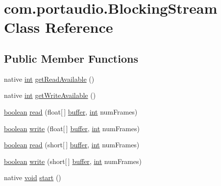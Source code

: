 \hypertarget{classcom_1_1portaudio_1_1_blocking_stream}{}\section{com.\+portaudio.\+Blocking\+Stream Class Reference}
\label{classcom_1_1portaudio_1_1_blocking_stream}
\subsection*{Public Member Functions}
\begin{DoxyCompactItemize}
\item 
native \hyperlink{xmltok_8h_a5a0d4a5641ce434f1d23533f2b2e6653}{int} \hyperlink{classcom_1_1portaudio_1_1_blocking_stream_a4cb237d1596fcfb10adf7e21166bfd10}{get\+Read\+Available} ()
\item 
native \hyperlink{xmltok_8h_a5a0d4a5641ce434f1d23533f2b2e6653}{int} \hyperlink{classcom_1_1portaudio_1_1_blocking_stream_a24fcac3b87ee7f15cbf97c9f821009dd}{get\+Write\+Available} ()
\item 
\hyperlink{cext_8h_a7670a4e8a07d9ebb00411948b0bbf86d}{boolean} \hyperlink{classcom_1_1portaudio_1_1_blocking_stream_ab6004b6eb81636c73053841b32c371fa}{read} (float\mbox{[}$\,$\mbox{]} \hyperlink{structbuffer}{buffer}, \hyperlink{xmltok_8h_a5a0d4a5641ce434f1d23533f2b2e6653}{int} num\+Frames)
\item 
\hyperlink{cext_8h_a7670a4e8a07d9ebb00411948b0bbf86d}{boolean} \hyperlink{classcom_1_1portaudio_1_1_blocking_stream_ab12ce694b065cb1729fff4815345b4a9}{write} (float\mbox{[}$\,$\mbox{]} \hyperlink{structbuffer}{buffer}, \hyperlink{xmltok_8h_a5a0d4a5641ce434f1d23533f2b2e6653}{int} num\+Frames)
\item 
\hyperlink{cext_8h_a7670a4e8a07d9ebb00411948b0bbf86d}{boolean} \hyperlink{classcom_1_1portaudio_1_1_blocking_stream_a3817b1e550497d46eb20459d9a41dc03}{read} (short\mbox{[}$\,$\mbox{]} \hyperlink{structbuffer}{buffer}, \hyperlink{xmltok_8h_a5a0d4a5641ce434f1d23533f2b2e6653}{int} num\+Frames)
\item 
\hyperlink{cext_8h_a7670a4e8a07d9ebb00411948b0bbf86d}{boolean} \hyperlink{classcom_1_1portaudio_1_1_blocking_stream_a4a7b50bb6f5f7cb1cb95748ec20ca874}{write} (short\mbox{[}$\,$\mbox{]} \hyperlink{structbuffer}{buffer}, \hyperlink{xmltok_8h_a5a0d4a5641ce434f1d23533f2b2e6653}{int} num\+Frames)
\item 
native \hyperlink{sound_8c_ae35f5844602719cf66324f4de2a658b3}{void} \hyperlink{classcom_1_1portaudio_1_1_blocking_stream_a8acbba9e18de0678780d1209548f9c8d}{start} ()

\end{DoxyCompactItemize}
